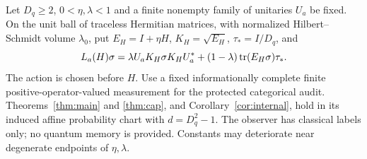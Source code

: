 \begin{theorem}\label{thm:quantum}
Let $D_q\ge2$, $0<\eta,\lambda<1$ and a finite nonempty family of unitaries $U_a$ be fixed. On the unit ball of traceless Hermitian matrices, with normalized Hilbert--Schmidt volume $\lambda_0$, put $E_H=I+\eta H$, $K_H=\sqrt{E_H}$, $\tau_*=I/D_q$, and
\begin{equation}\label{eq:quantum}
 L_a(H)\sigma=\lambda U_aK_H\sigma K_HU_a^*
           +(1-\lambda)\operatorname{tr}(E_H\sigma)\tau_*.
\end{equation}
The action is chosen before $H$. Use a fixed informationally complete finite positive-operator-valued measurement for the protected categorical audit. Theorems~\ref{thm:main} and \ref{thm:cap}, and Corollary~\ref{cor:internal}, hold in its induced affine probability chart with $d=D_q^2-1$. The observer has classical labels only; no quantum memory is provided. Constants may deteriorate near degenerate endpoints of $\eta,\lambda$.
\end{theorem}
